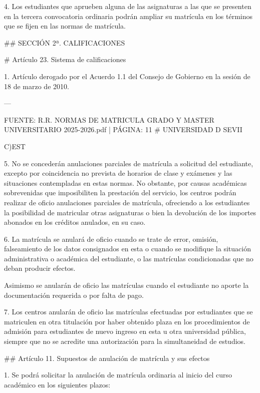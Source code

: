 \documentclass{article}
\begin{document}
\begin{itemize}
\begin{itemize}
\begin{scriptsize}
                  4. Los estudiantes que aprueben alguna de las asignaturas a las que se presenten en la tercera convocatoria ordinaria podrán ampliar su matrícula en los términos que se fijen en las normas de matrícula.

                  \#\# SECCIÓN 2ª. CALIFICACIONES

                  \# Artículo 23. Sistema de calificaciones

                  1. Artículo derogado por el Acuerdo 1.1 del Consejo de Gobierno en la sesión de 18 de marzo de 2010.

                  ---

                  FUENTE: R.R. NORMAS DE MATRICULA GRADO Y MASTER UNIVERSITARIO 2025-2026.pdf | PÁGINA: 11
                  \# UNIVERSIDAD D SEVII

                  C)EST

                  5. No se concederán anulaciones parciales de matrícula a solicitud del estudiante, excepto por coincidencia no prevista de horarios de clase y exámenes y las situaciones contempladas en estas normas. No obstante, por causas académicas sobrevenidas que imposibiliten la prestación del servicio, los centros podrán realizar de oficio anulaciones parciales de matrícula, ofreciendo a los estudiantes la posibilidad de matricular otras asignaturas o bien la devolución de los importes abonados en los créditos anulados, en su caso.

                  6. La matrícula se anulará de oficio cuando se trate de error, omisión, falseamiento de los datos consignados en esta o cuando se modifique la situación administrativa o académica del estudiante, o las matrículas condicionadas que no deban producir efectos.

                  Asimismo se anularán de oficio las matrículas cuando el estudiante no aporte la documentación requerida o por falta de pago.

                  7. Los centros anularán de oficio las matrículas efectuadas por estudiantes que se matriculen en otra titulación por haber obtenido plaza en los procedimientos de admisión para estudiantes de nuevo ingreso en esta u otra universidad pública, siempre que no se acredite una autorización para la simultaneidad de estudios.

                  \#\# Artículo 11. Supuestos de anulación de matrícula y sus efectos

                  1. Se podrá solicitar la anulación de matrícula ordinaria al inicio del curso académico en los siguientes plazos:


\end{scriptsize}
\end{itemize}
\end{itemize}
\end{document}
